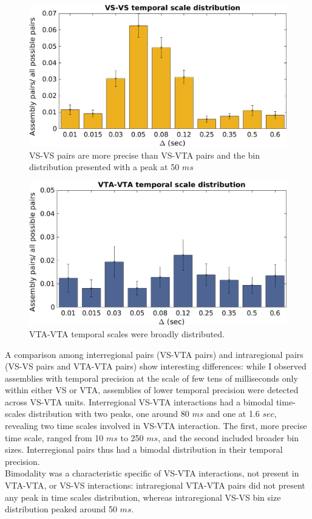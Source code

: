 \begin{figure}[H]
\centering
\includegraphics[scale=0.46]{figures/VS_VS_S.png}
\caption{VS-VS pairs are more precise than VS-VTA pairs and the bin distribution presented with a peak at 50 $ms$}
\label{fig:BinDistrVS}
\end{figure}
\begin{figure}[H]
\centering
\includegraphics[scale=0.46]{figures/VTA_VTA_S.png}
\caption{VTA-VTA temporal scales were broadly distributed.}
\label{fig:BinDistrVTA}
\end{figure}
A comparison among interregional pairs (VS-VTA pairs) and intraregional pairs (VS-VS pairs and VTA-VTA pairs) show interesting differences: while I observed assemblies with temporal precision at the scale of few tens of milliseconds only within either VS or VTA, assemblies of lower temporal precision were detected across VS-VTA units. Interregional VS-VTA interactions had a bimodal time-scales distribution with two peaks, one around 80 $ms$ and one at 1.6 $sec$, revealing two time scales involved in VS-VTA interaction. The first, more precise time scale, ranged from 10 $ms$ to 250 $ms$, and the second included broader bin sizes. Interregional pairs thus had a bimodal distribution in their temporal precision.\\Bimodality was a characteristic specific of VS-VTA interactions, not present in VTA-VTA, or VS-VS interactions: intraregional VTA-VTA pairs did not present any peak in time scales distribution, whereas intraregional VS-VS bin size distribution peaked around 50 $ms$.  
